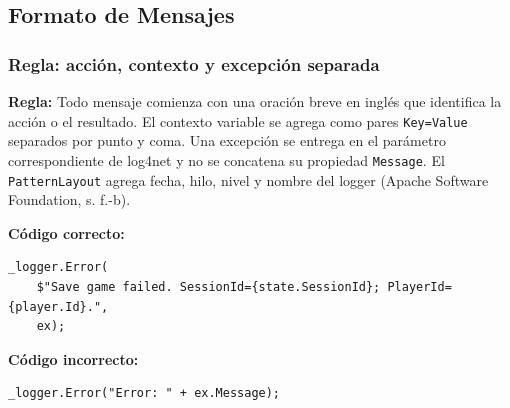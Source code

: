 \subsection{Formato de Mensajes}

\subsubsection{Regla: acción, contexto y excepción separada}

\textbf{Regla:} Todo mensaje comienza con una oración breve en inglés que identifica la acción o el resultado. El contexto variable se agrega como pares \texttt{Key=Value} separados por punto y coma. Una excepción se entrega en el parámetro correspondiente de log4net y no se concatena su propiedad \texttt{Message}. El \texttt{PatternLayout} agrega fecha, hilo, nivel y nombre del logger (Apache Software Foundation, s. f.-b).

\textbf{Código correcto:}
\begin{lstlisting}[style=csharpstyle]
_logger.Error(
    $"Save game failed. SessionId={state.SessionId}; PlayerId={player.Id}.",
    ex);
\end{lstlisting}

\textbf{Código incorrecto:}
\begin{lstlisting}[style=csharpstyle]
_logger.Error("Error: " + ex.Message);
\end{lstlisting}
